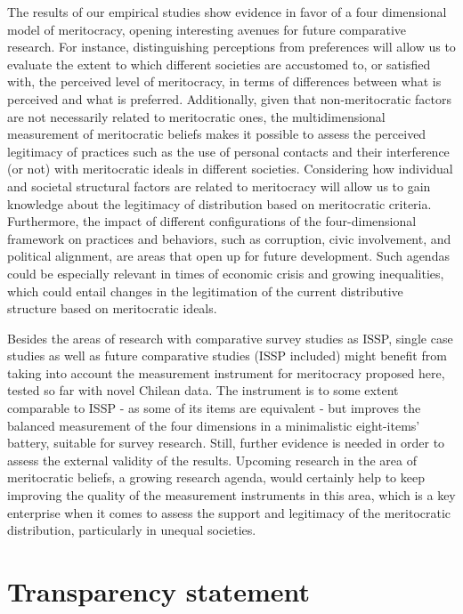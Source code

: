 \documentclass[
  10pt,
  a4paper,
]{article}
\begin{document}
The results of our empirical studies show evidence in favor of a four dimensional model of meritocracy, opening interesting avenues for future comparative research. For instance, distinguishing perceptions from preferences will allow us to evaluate the extent to which different societies are accustomed to, or satisfied with, the perceived level of meritocracy, in terms of differences between what is perceived and what is preferred. Additionally, given that non-meritocratic factors are not necessarily related to meritocratic ones, the multidimensional measurement of meritocratic beliefs makes it possible to assess the perceived legitimacy of practices such as the use of personal contacts and their interference (or not) with meritocratic ideals in different societies. Considering how individual and societal structural factors are related to meritocracy will allow us to gain knowledge about the legitimacy of distribution based on meritocratic criteria. Furthermore, the impact of different configurations of the four-dimensional framework on practices and behaviors, such as corruption, civic involvement, and political alignment, are areas that open up for future development. Such agendas could be especially relevant in times of economic crisis and growing inequalities, which could entail changes in the legitimation of the current distributive structure based on meritocratic ideals.

Besides the areas of research with comparative survey studies as ISSP, single case studies as well as future comparative studies (ISSP included) might benefit from taking into account the measurement instrument for meritocracy proposed here, tested so far with novel Chilean data. The instrument is to some extent comparable to ISSP - as some of its items are equivalent - but improves the balanced measurement of the four dimensions in a minimalistic eight-items' battery, suitable for survey research. Still, further evidence is needed in order to assess the external validity of the results. Upcoming research in the area of meritocratic beliefs, a growing research agenda, would certainly help to keep improving the quality of the measurement instruments in this area, which is a key enterprise when it comes to assess the support and legitimacy of the meritocratic distribution, particularly in unequal societies.

\section{Transparency statement}\label{transparency-statement}
\end{document}
